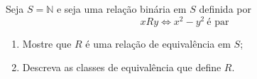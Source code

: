 \item
  Seja $S =\mathbb{N}$ e seja uma relação binária em $S$ definida por
  \[
	xRy \Leftrightarrow x^2-y^2\ \text{é par}
  \]
  \begin{enumerate}
	\item 	Mostre que $R$ é uma relação de equivalência em $S$;
	\item Descreva as classes de equivalência que define $R$.
  \end{enumerate}
